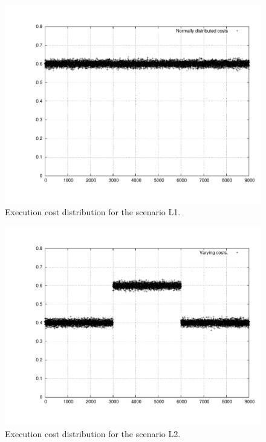 \documentclass[times, 10pt,twocolumn]{article}
\begin{document}
\begin{figure}[h!t]
  \centering
  \includegraphics[scale=0.33]{trace-normal}
  \caption{Execution cost distribution for the scenario L1.}
  \label{fig:plotl1}
\end{figure}

\begin{figure}[h!t]
  \centering
  \includegraphics[scale=0.33]{trace-trifasico}
  \caption{Execution cost distribution for the scenario L2.}
  \label{fig:plotl2}
\end{figure}
\end{document}

